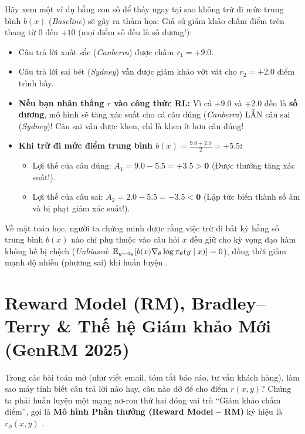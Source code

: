 \begin{debate}[Câu hỏi Kỹ sư số 4: ``Tại sao phải dùng Điểm Lợi Thế $A(x, y) = r(x, y) - b(x)$ (trừ đi mức trung bình $b(x)$) mà không lấy thẳng điểm thưởng $r(x, y)$ nhân vào công thức?'']
Hãy xem một ví dụ bằng con số để thấy ngay tại sao không trừ đi mức trung bình $b(x)$ (\textit{Baseline}) sẽ gây ra thảm họa:
Giả sử giám khảo chấm điểm trên thang từ $0$ đến $+10$ (mọi điểm số đều là số dương!):
\begin{itemize}[leftmargin=1.2cm]
    \item Câu trả lời xuất sắc (\textit{Canberra}) được chấm $r_1 = +9.0$.
    \item Câu trả lời sai bét (\textit{Sydney}) vẫn được giám khảo vớt vát cho $r_2 = +2.0$ điểm trình bày.
    \item \textbf{Nếu bạn nhân thẳng $r$ vào công thức RL:} Vì cả $+9.0$ và $+2.0$ đều là \textbf{số dương}, mô hình sẽ tăng xác suất cho cả câu đúng (\textit{Canberra}) LẪN câu sai (\textit{Sydney})! Câu sai vẫn được khen, chỉ là khen ít hơn câu đúng!
    \item \textbf{Khi trừ đi mức điểm trung bình $b(x) = \frac{9.0 + 2.0}{2} = +5.5$:}
    \begin{itemize}
        \item Lợi thế của câu đúng: $A_1 = 9.0 - 5.5 = \mathbf{+3.5 > 0}$ (Được thưởng tăng xác suất!).
        \item Lợi thế của câu sai: $A_2 = 2.0 - 5.5 = \mathbf{-3.5 < 0}$ (Lập tức biến thành số âm và bị phạt giảm xác suất!).
    \end{itemize}
\end{itemize}
Về mặt toán học, người ta chứng minh được rằng việc trừ đi bất kỳ hằng số trung bình $b(x)$ nào chỉ phụ thuộc vào câu hỏi $x$ đều giữ cho kỳ vọng đạo hàm không hề bị chệch (\textit{Unbiased}: $\operatorname{\mathbb{E}}_{y \sim \pi_\theta}[b(x)\nabla_\theta \log \pi_\theta(y \mid x)] = 0$), đồng thời giảm mạnh độ nhiễu (phương sai) khi huấn luyện \citep{williams1992simple, sutton2018reinforcement}.
\end{debate}

\section{Reward Model (RM), Bradley--Terry \& Thế hệ Giám khảo Mới (GenRM 2025)}
\label{sec:reward_model_eng}

Trong các bài toán mở (như viết email, tóm tắt báo cáo, tư vấn khách hàng), làm sao máy tính biết câu trả lời nào hay, câu nào dở để cho điểm $r(x, y)$? Chúng ta phải huấn luyện một mạng nơ-ron thứ hai đóng vai trò ``Giám khảo chấm điểm'', gọi là \textbf{Mô hình Phần thưởng (Reward Model -- RM)} ký hiệu là $r_\phi(x, y)$ \citep{christiano2017deep, stiennon2020learning, ouyang2022training}.

